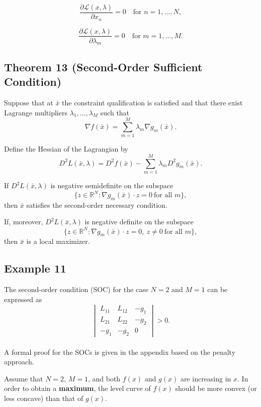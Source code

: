 \[
\frac{\partial \mathcal{L}(x,\lambda)}{\partial x_n} = 0
\quad \text{for } n=1,\dots,N,
\]

\[
\frac{\partial \mathcal{L}(x,\lambda)}{\partial \lambda_m} = 0
\quad \text{for } m=1,\dots,M.
\]

\medskip

\begin{tcolorbox}[breakable, colback=white]

\subsection*{Theorem 13 (Second-Order Sufficient Condition)}

Suppose that at $\bar x$ the constraint qualification is satisfied and that
there exist Lagrange multipliers $\lambda_1,\dots,\lambda_M$ such that
\[
\nabla f(\bar x) = \sum_{m=1}^M \lambda_m \nabla g_m(\bar x).
\]

Define the Hessian of the Lagrangian by
\[
D^2 L(\bar x,\lambda)
=
D^2 f(\bar x)
-
\sum_{m=1}^M \lambda_m D^2 g_m(\bar x).
\]

If $D^2 L(\bar x,\lambda)$ is negative semidefinite on the subspace
\[
\{ z \in \mathbb{R}^N : \nabla g_m(\bar x)\cdot z = 0 \ \text{for all } m \},
\]
then $\bar x$ satisfies the second-order necessary condition.

If, moreover, $D^2 L(\bar x,\lambda)$ is negative definite on the subspace
\[
\{ z \in \mathbb{R}^N : \nabla g_m(\bar x)\cdot z = 0,\ z \ne 0 \ \text{for all } m \},
\]
then $\bar x$ is a local maximizer.


\end{tcolorbox}


\subsection*{Example 11}

The second-order condition (SOC) for the case $N=2$ and $M=1$ can be expressed as
\[
\begin{vmatrix}
L_{11} & L_{12} & -g_1 \\
L_{21} & L_{22} & -g_2 \\
-g_1 & -g_2 & 0
\end{vmatrix}
> 0.
\]\\

A formal proof for the SOCs is given in the appendix based on the penalty approach.

\medskip

Assume that $N=2$, $M=1$, and both $f(x)$ and $g(x)$ are increasing in $x$.
In order to obtain a \textbf{maximum}, the level curve of $f(x)$ should be more convex
(or less concave) than that of $g(x)$.

